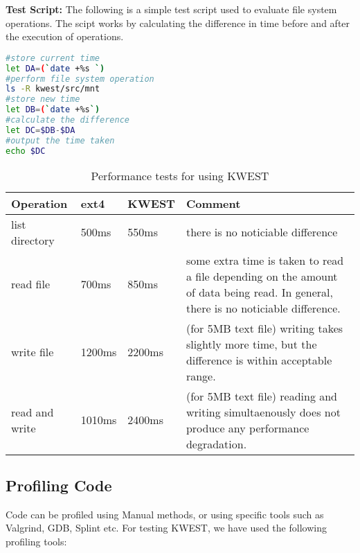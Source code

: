 \textbf{Test Script:} The following is a simple test script used to evaluate file system operations. The scipt works by calculating the difference in time before and after the execution of operations.
\begin{lstlisting}[language=bash,frame=single]
#store current time
let DA=(`date +%s `)
#perform file system operation
ls -R kwest/src/mnt
#store new time
let DB=(`date +%s`)
#calculate the difference
let DC=$DB-$DA
#output the time taken
echo $DC
\end{lstlisting}

\begin{table}[h]
\begin{tabular}{|p{2cm}|p{1.5cm}|p{1.5cm}|p{7cm}|}
\hline
\textbf{Operation} & \textbf{ext4} & \textbf{KWEST} & \textbf{Comment} \\ \hline
list directory	&	500ms	&	550ms & there is no noticiable difference \\ \hline
read file	&	700ms & 850ms	& some extra time is taken to read a file depending on the amount of data being read. In general, there is no noticiable difference. \\ \hline
write file	&	1200ms & 2200ms	& (for 5MB text file) writing takes slightly more time, but the difference is within acceptable range. \\ \hline
read and write	&	1010ms & 2400ms & (for 5MB text file) reading and writing simultaenously does not produce any performance degradation. \\
\hline
\end{tabular}
\caption{Performance tests for using KWEST}
\label{performancetests}
\end{table}

\subsection{Profiling Code}
Code can be profiled using Manual methods, or using specific tools such as Valgrind, GDB, Splint etc. For testing KWEST, we have used the following profiling tools:
